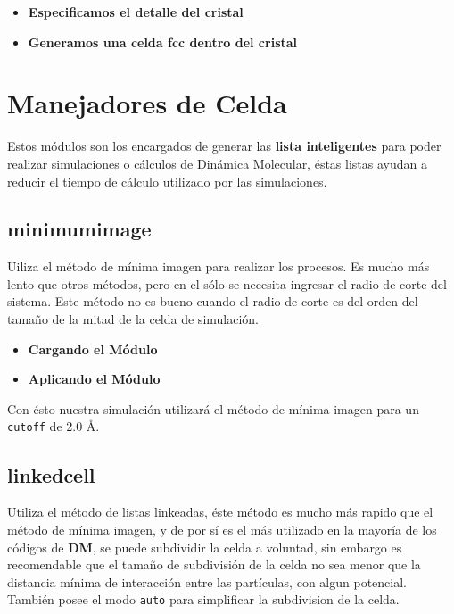 \begin{itemize}
 \item \textbf{Especificamos el detalle del cristal}
 \item \textbf{Generamos una celda  fcc dentro del cristal}
\end{itemize}
\section{Manejadores de Celda}
Estos m\'odulos son los encargados de generar las \textbf{lista inteligentes} para poder realizar simulaciones o c\'alculos de Din\'amica Molecular, \'estas listas ayudan a reducir el tiempo de c\'alculo utilizado por las simulaciones.

\subsection{minimumimage}
Uiliza el m\'etodo de m\'inima imagen para realizar los procesos. Es mucho m\'as lento que otros m\'etodos, pero en el s\'olo se necesita ingresar el radio de corte del sistema. Este m\'etodo no es bueno cuando el radio de corte es del orden del tama\~no de la mitad de la celda de simulaci\'on.

\begin{itemize}
 \item \textbf{Cargando el M\'odulo}
 \item \textbf{Aplicando el M\'odulo}
\end{itemize}

Con \'esto nuestra simulaci\'on utilizar\'a el m\'etodo de m\'inima imagen para un \verb|cutoff| de 2.0 \AA.

\subsection{linkedcell}
Utiliza el m\'etodo de listas linkeadas, \'este m\'etodo es mucho m\'as rapido que el m\'etodo de m\'inima imagen, y de por s\'i es el m\'as utilizado en la mayor\'ia de los c\'odigos de \textbf{DM}, se puede subdividir la celda a voluntad, sin embargo es recomendable que el tama\~no de subdivisi\'on de la celda no sea menor que la distancia m\'inima de interacci\'on entre las part\'iculas, con algun potencial. Tambi\'en posee el modo \verb|auto| para simplificar la subdivision de la celda.

